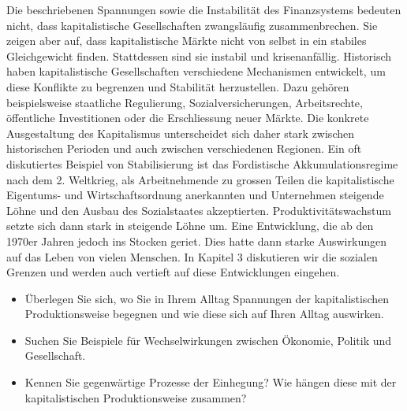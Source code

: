 \documentclass[
  nswissgerman,
  a4paper,
  DIV=11,
  numbers=noendperiod,
  oneside,
  openany]{scrreprt}
\providecommand{\tightlist}{%
  \setlength{\itemsep}{0pt}\setlength{\parskip}{0pt}}
\begin{document}
Die beschriebenen Spannungen sowie die Instabilität des Finanzsystems
bedeuten nicht, dass kapitalistische Gesellschaften zwangsläufig
zusammenbrechen. Sie zeigen aber auf, dass kapitalistische Märkte nicht
von selbst in ein stabiles Gleichgewicht finden. Stattdessen sind sie
instabil und krisenanfällig. Historisch haben kapitalistische
Gesellschaften verschiedene Mechanismen entwickelt, um diese Konflikte
zu begrenzen und Stabilität herzustellen. Dazu gehören beispielsweise
staatliche Regulierung, Sozialversicherungen, Arbeitsrechte, öffentliche
Investitionen oder die Erschliessung neuer Märkte. Die konkrete
Ausgestaltung des Kapitalismus unterscheidet sich daher stark zwischen
historischen Perioden und auch zwischen verschiedenen Regionen. Ein oft
diskutiertes Beispiel von Stabilisierung ist das Fordistische
Akkumulationsregime nach dem 2. Weltkrieg, als Arbeitnehmende zu grossen
Teilen die kapitalistische Eigentums- und Wirtschaftsordnung anerkannten
und Unternehmen steigende Löhne und den Ausbau des Sozialstaates
akzeptierten. Produktivitätswachstum setzte sich dann stark in steigende
Löhne um. Eine Entwicklung, die ab den 1970er Jahren jedoch ins Stocken
geriet. Dies hatte dann starke Auswirkungen auf das Leben von vielen
Menschen. In Kapitel 3 diskutieren wir die sozialen Grenzen und werden
auch vertieft auf diese Entwicklungen eingehen.

\begin{tcolorbox}[enhanced jigsaw, arc=.35mm, bottomrule=.15mm, bottomtitle=1mm, breakable, colback=white, colbacktitle=quarto-callout-note-color!10!white, colframe=quarto-callout-note-color-frame, coltitle=black, left=2mm, leftrule=.75mm, opacityback=0, opacitybacktitle=0.6, rightrule=.15mm, title={Vertiefungsfragen}, titlerule=0mm, toprule=.15mm, toptitle=1mm]

\begin{itemize}
\tightlist
\item
  Überlegen Sie sich, wo Sie in Ihrem Alltag Spannungen der
  kapitalistischen Produktionsweise begegnen und wie diese sich auf
  Ihren Alltag auswirken.
\item
  Suchen Sie Beispiele für Wechselwirkungen zwischen Ökonomie, Politik
  und Gesellschaft.
\item
  Kennen Sie gegenwärtige Prozesse der Einhegung? Wie hängen diese mit
  der kapitalistischen Produktionsweise zusammen?
\end{itemize}

\end{tcolorbox}
\end{document}
